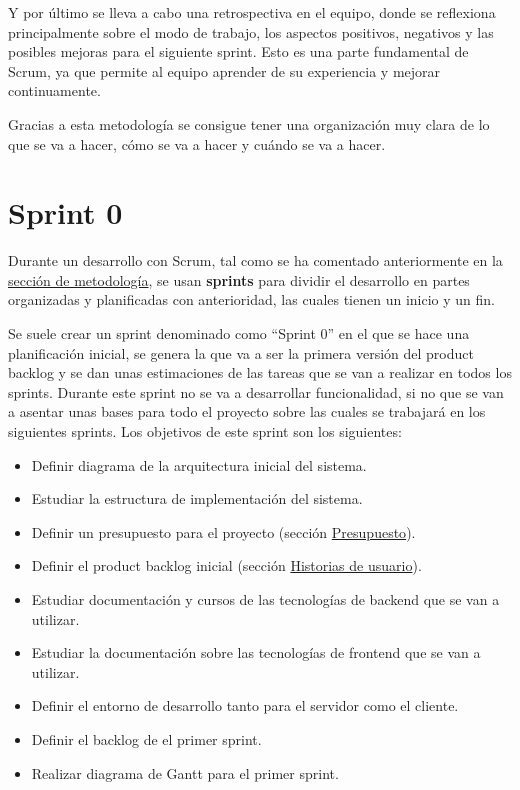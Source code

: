 Y por último se lleva a cabo una retrospectiva en el equipo, donde se reflexiona principalmente sobre el modo de trabajo, los aspectos positivos, negativos y las posibles mejoras para el siguiente sprint. Esto es una parte fundamental de Scrum, ya que permite al equipo aprender de su experiencia y mejorar continuamente.

Gracias a esta metodología se consigue tener una organización muy clara de lo que se va a hacer, cómo se va a hacer y cuándo se va a hacer.

\section{Sprint 0}
\label{sec:planificacion-inicial}
Durante un desarrollo con Scrum, tal como se ha comentado anteriormente en la \hyperref[sec:metodologia]{sección de metodología}, se usan \textbf{sprints} para dividir el desarrollo en partes organizadas y planificadas con anterioridad, las cuales tienen un inicio y un fin.

Se suele crear un sprint denominado como ``Sprint 0'' en el que se hace una planificación inicial, se genera la que va a ser la primera versión del product backlog y se dan unas estimaciones de las tareas que se van a realizar en todos los sprints.
Durante este sprint no se va a desarrollar funcionalidad, si no que se van a asentar unas bases para todo el proyecto sobre las cuales se trabajará en los siguientes sprints.
Los objetivos de este sprint son los siguientes:

\begin{itemize}
    \item Definir diagrama de la arquitectura inicial del sistema.
    \item Estudiar la estructura de implementación del sistema.
    \item Definir un presupuesto para el proyecto (sección \hyperref[sec:presupuesto]{Presupuesto}).
    \item Definir el product backlog inicial (sección \hyperref[sec:historias-de-usuario]{Historias de usuario}).
    \item Estudiar documentación y cursos de las tecnologías de backend que se van a utilizar.
    \item Estudiar la documentación sobre las tecnologías de frontend que se van a utilizar.
    \item Definir el entorno de desarrollo tanto para el servidor como el cliente.
    \item Definir el backlog de el primer sprint.
    \item Realizar diagrama de Gantt para el primer sprint.
\end{itemize}

